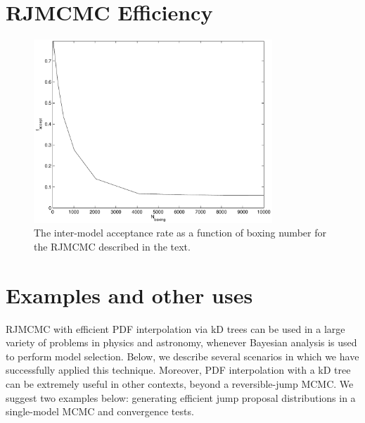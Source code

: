 \documentclass[prd,preprint]{revtex4}
\begin{document}
\section{RJMCMC Efficiency}

\begin{figure}
  \begin{center}
    \includegraphics[width=0.8\textwidth]{acceptRate}
  \end{center}
  \caption{\label{fig:acceptRate} The inter-model acceptance rate as a
    function of boxing number for the RJMCMC described in the text.}
\end{figure}

\section{Examples and other uses} \label{sec:examples}

RJMCMC with efficient PDF interpolation via kD trees can be used in a large variety of problems in physics and astronomy, whenever Bayesian analysis is used to perform model selection.  Below, we describe several scenarios in which we have successfully applied this technique.  Moreover, PDF interpolation with a kD tree can be extremely useful in other contexts, beyond a reversible-jump MCMC.  We suggest two examples below: generating efficient jump proposal distributions in a single-model MCMC and convergence tests.
\end{document}
